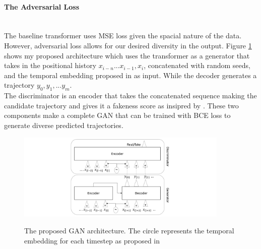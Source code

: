 \documentclass{article}
\begin{document}
\paragraph{The Adversarial Loss}$ $
\\The baseline transformer uses MSE loss given the spacial nature of the data. However, adversarial loss allows for our desired diversity in the output. Figure \ref{gen_disc_figure} shows my proposed architecture which uses the transformer as a generator that takes in the positional history $x_{i-n}...x_{i-1}, x_{i}$, concatenated with random seeds, and the temporal embedding proposed in \cite{giuliari2020transformer} as input. While the decoder generates a trajectory $y_0, y_1, ... y_m$. 
\\ The discriminator is an encoder that takes the concatenated sequence making the candidate trajectory and gives it a fakeness score as insipred by \cite{fakereviewsgan}. These two components make a complete GAN that can be trained with BCE loss to generate diverse predicted trajectories.

\begin{figure}
    \centering
    \includegraphics[width=0.9\textwidth]{gen-disc-figure.pdf}\\
    \caption{The proposed GAN architecture.  The circle represents the temporal embedding for each timestep as proposed in \cite{giuliari2020transformer}}
    \label{gen_disc_figure}
\end{figure}
\end{document}
